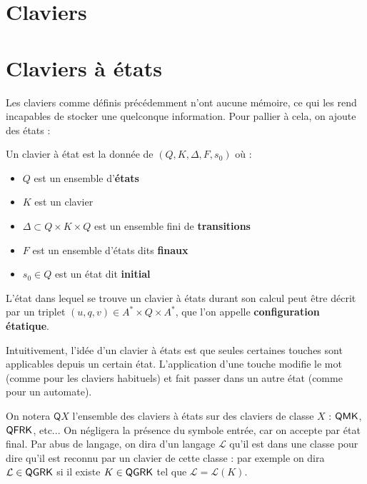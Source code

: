 \documentclass[12pt, a4paper]{article}
\renewcommand{\L}{\mathcal{L}}
\begin{document}
    \section{Claviers}




	\section{Claviers à états}
    Les claviers comme définis précédemment n'ont aucune mémoire, ce qui les rend incapables de stocker une quelconque information.
    Pour pallier à cela, on ajoute des états :
    \begin{defétats}
        Un clavier à état est la donnée de $(Q,K,\Delta ,F,s_0)$ où :
        \begin{itemize}
            \item $Q$ est un ensemble d'\textbf{états}
            \item $K$ est un clavier
            \item $\Delta \subset Q \times K \times Q$ est un ensemble fini de \textbf{transitions}
            \item $F$ est un ensemble d'états dits \textbf{finaux}
            \item $s_0 \in Q$ est un état dit \textbf{initial}
        \end{itemize}
    \end{defétats}
    \begin{configétats}
        L'état dans lequel se trouve un clavier à états durant son calcul peut être décrit par un triplet $(u,q,v) \in A^* \times Q \times A^*$, que l'on appelle \textbf{configuration étatique}.

    \end{configétats}
    Intuitivement, l'idée d'un clavier à états est que seules certaines touches sont applicables depuis un certain état. L'application d'une touche modifie le mot (comme pour les claviers habituels)
    et fait passer dans un autre état (comme pour un automate).

    On notera $\mathsf{Q}X$ l'ensemble des claviers à états sur des claviers de classe $X$ : $\mathsf{QMK}$, $\mathsf{QFRK}$, etc... 
    On négligera la présence du symbole entrée, car on accepte par état final.
    Par abus de langage, on dira d'un langage $\L$ qu'il est dans une classe pour dire qu'il est reconnu par un clavier de cette classe : 
    par exemple on dira $\L \in \QGRK$ si il existe $K \in \mathsf{QGRK}$ tel que $\L = \L(K)$.
\end{document}
